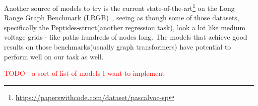 Another source of models to try is the current
state-of-the-art\footnote{\url{https://paperswithcode.com/dataset/pascalvoc-sp}} on the
Long Range Graph Benchmark (LRGB)~\cite{dwivedi2022long}, seeing as though some of those
datasets, specifically the Peptides-struct(another regression task), look a lot like
medium voltage grids - like paths hundreds of nodes long.
The models that achieve good results on those benchmarks(usually graph transformers)
have potential to perform well on our task as well.

\textcolor{red}{TODO - a sort of list of models I want to implement}